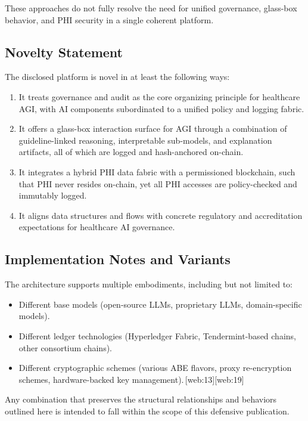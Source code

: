 \documentclass[11pt]{article}
\begin{document}
These approaches do not fully resolve the need for unified governance, glass-box behavior, and PHI security in a single coherent platform.

\subsection{Novelty Statement}

The disclosed platform is novel in at least the following ways:
\begin{enumerate}[nosep]
  \item It treats governance and audit as the core organizing principle for healthcare AGI, with AI components subordinated to a unified policy and logging fabric.
  \item It offers a glass-box interaction surface for AGI through a combination of guideline-linked reasoning, interpretable sub-models, and explanation artifacts, all of which are logged and hash-anchored on-chain.
  \item It integrates a hybrid PHI data fabric with a permissioned blockchain, such that PHI never resides on-chain, yet all PHI accesses are policy-checked and immutably logged.
  \item It aligns data structures and flows with concrete regulatory and accreditation expectations for healthcare AI governance.
\end{enumerate}

\subsection{Implementation Notes and Variants}

The architecture supports multiple embodiments, including but not limited to:
\begin{itemize}[nosep]
  \item Different base models (open-source LLMs, proprietary LLMs, domain-specific models).
  \item Different ledger technologies (Hyperledger Fabric, Tendermint-based chains, other consortium chains).
  \item Different cryptographic schemes (various ABE flavors, proxy re-encryption schemes, hardware-backed key management).\,[web:13][web:19]
\end{itemize}

Any combination that preserves the structural relationships and behaviors outlined here is intended to fall within the scope of this defensive publication.
\end{document}
